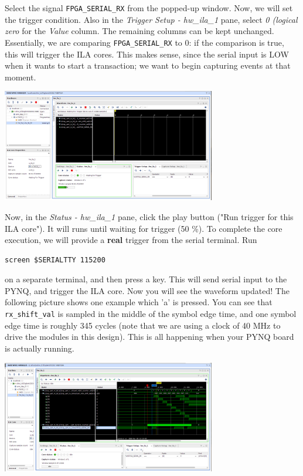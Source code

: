 \documentclass[11pt]{article}
\begin{document}
Select the signal \verb|FPGA_SERIAL_RX| from the popped-up window. Now, we will set the trigger condition. Also in the \emph{Trigger Setup - hw\_ila\_1} pane, select \emph{0 (logical zero} for the \emph{Value} column. The remaining columns can be kept unchanged. Essentially, we are comparing \verb|FPGA_SERIAL_RX| to 0: if the comparison is true, this will trigger the ILA cores. This makes sense, since the serial input is LOW when it wants to start a transaction; we want to begin capturing events at that moment.

\begin{center}
\includegraphics[width=0.7\textwidth]{figs/vivado-ila-8.png}
\end{center}

Now, in the \emph{Status - hw\_ila\_1} pane, click the play button ("Run trigger for this ILA core"). It will runs until waiting for trigger (50 \%). To complete the core execution, we will provide a \textbf{real} trigger from the serial terminal. Run

\begin{verbatim}
screen $SERIALTTY 115200
\end{verbatim}

on a separate terminal, and then press a key. This will send serial input to the PYNQ, and trigger the ILA core. Now you will see the waveform updated! The following picture shows one example which 'a' is pressed. You can see that \verb|rx_shift_val| is sampled in the middle of the symbol edge time, and one symbol edge time is roughly 345 cycles (note that we are using a clock of 40 MHz to drive the modules in this design). This is all happening when your PYNQ board is actually running.

\begin{center}
\includegraphics[width=0.7\textwidth]{figs/vivado-ila-9.png}
\end{center}
\end{document}
